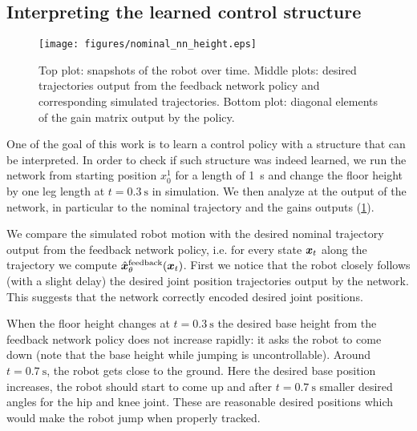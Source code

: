 \subsection{Interpreting the learned control structure}
%
\begin{figure}
    \centering
%
      \texttt{[image: figures/nominal\_nn\_height.eps]}
%
    \caption{Top plot: snapshots of the robot over time. Middle plots: desired trajectories output from the feedback network policy and corresponding simulated trajectories. Bottom plot: diagonal elements of the gain matrix output by the policy.}
%
    \label{fig:result_nominal_traj}
\vspace{-0.6cm}
\end{figure}
%
One of the goal of this work is to learn a control policy with a structure that can
be interpreted.
In order to check if such structure was indeed learned, we run the network from starting position $x^1_0$ for a length of \SI{1}{\second} and change the floor height by one leg length at $t=\SI{0.3}{\second}$ in simulation. We then analyze at the output of the network, in particular to the nominal trajectory and the gains outputs (\cref{fig:result_nominal_traj}).

We compare the simulated robot motion with the desired nominal trajectory output from the feedback network policy, i.e. for every state $\bm{x}_{t}$ along the trajectory we compute $\hat{\bm{x}}^\text{feedback}_\theta(\bm{x}_t)$.
First we notice that the robot closely follows (with a slight delay) the desired joint position trajectories
output by the network. This suggests that the network correctly encoded desired joint positions.

When the floor height changes at $t=\SI{0.3}{\second}$ the desired base height from the feedback network policy does not increase rapidly: it asks the robot to come down (note that the base height while jumping is uncontrollable).
Around $t=\SI{0.7}{\second}$, the robot gets close to the ground. Here the desired base position increases, the robot should start to come up and after $t=\SI{0.7}{\second}$ smaller desired angles for the hip and knee joint. These are reasonable desired positions which would make the robot jump when properly tracked.

